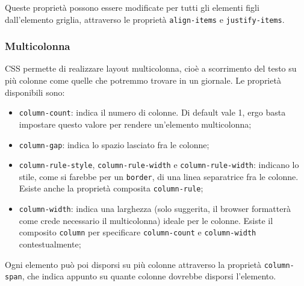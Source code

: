 \documentclass[a4paper,11pt]{article}
\begin{document}
Queste proprietà possono essere modificate per tutti gli elementi figli dall'elemento griglia, attraverso le proprietà \lstinline|align-items| e \lstinline|justify-items|.

\subsubsection{Multicolonna}
CSS permette di realizzare layout multicolonna, cioè a scorrimento del testo su più colonne come quelle che potremmo trovare in un giornale.
Le proprietà disponibili sono:
\begin{itemize}
	\item \lstinline|column-count|: indica il numero di colonne. Di default vale 1, ergo basta impostare questo valore per rendere un'elemento multicolonna;
	\item \lstinline|column-gap|: indica lo spazio lasciato fra le colonne;
	\item \lstinline|column-rule-style|, \lstinline|column-rule-width| e \lstinline|column-rule-width|: indicano lo stile, come si farebbe per un \lstinline|border|, di una linea separatrice fra le colonne. Esiste anche la proprietà composita \lstinline|column-rule|;
	\item \lstinline|column-width|: indica una larghezza (solo suggerita, il browser formatterà come crede necessario il multicolonna) ideale per le colonne. Esiste il composito \lstinline|column| per specificare \lstinline|column-count| e \lstinline|column-width| contestualmente;
\end{itemize}

Ogni elemento può poi disporsi su più colonne attraverso la proprietà \lstinline|column-span|, che indica appunto su quante colonne dovrebbe disporsi l'elemento.
\end{document}
